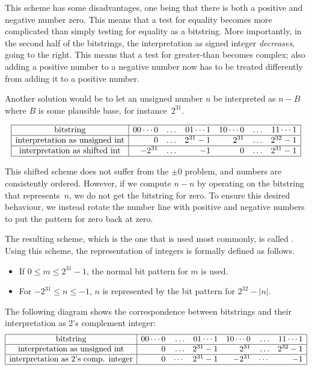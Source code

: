 This scheme has some disadvantages, one being that
there is both a positive and negative number zero. This means that a test
for equality becomes more complicated than simply testing for equality
as a bitstring. More importantly, in the second half of the
bitstrings, the interpretation as signed integer \emph{decreases},
going to the right. This means that a test for greater-than becomes
complex; also
adding a positive number to a
negative number now has to be treated differently from adding it to a
positive number.

Another solution would be to let an unsigned number $n$ be interpreted
as $n-B$ where $B$ is some plausible base, for instance~$2^{31}$.

\[
\begin{array}{|c|rrrrrr|}
  \hline
  \hbox{bitstring}&
  00\cdots0&\ldots&01\cdots1&
  10\cdots0&\ldots&11\cdots1\\ \hline
  \hbox{interpretation as unsigned int}&
  0&\ldots&2^{31}-1&
  2^{31}&\ldots&2^{32}-1\\ \hline
  \hbox{interpretation as shifted int}&
  -2^{31}&\ldots&-1&
  0&\ldots&2^{31}-1\\ \hline
\end{array}
\]

This shifted scheme does not suffer from the $\pm0$ problem, and
numbers are consistently ordered. However, if we compute $n-n$
by operating on the bitstring that represents~$n$, we do not 
get the bitstring for zero. To ensure this desired behaviour,
we instead rotate the number line with positive and negative numbers
to put the pattern for zero back at zero.

The resulting scheme, which is the one that is used most commonly, is
called . Using this scheme,
the representation of integers is
formally defined as follows.
\begin{itemize}
\item If $0\leq m\leq 2^{31}-1$, the normal bit pattern for $m$ is
  used.
\item For $-2^{31}\leq n\leq -1$, $n$ is represented by the bit
  pattern for $2^{32}-|n|$.
\end{itemize}
The following diagram shows the correspondence between bitstrings and
their interpretation as 2's complement integer:
\[
\begin{array}{|c|rrrrrr|}
  \hline
  \hbox{bitstring}&
  00\cdots0&\ldots&01\cdots1&
  10\cdots0&\ldots&11\cdots1\\ \hline
  \hbox{interpretation as unsigned int}&
  0&\ldots&2^{31}-1&
  2^{31}&\ldots&2^{32}-1\\ \hline
  \hbox{interpretation as 2's comp. integer}&
  0&\cdots&2^{31}-1&
  -2^{31}&\cdots&-1\\
  \hline
\end{array}
\]

